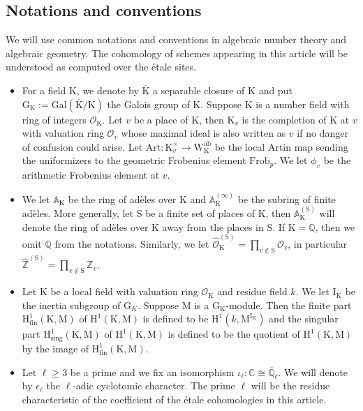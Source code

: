 \documentclass[10pt]{amsart}
\numberwithin{equation}{section}
\theoremstyle{definition}
\def\Gal{\mathrm{Gal}}
\def\Frob{\mathrm{Frob}}
\def\calO{\mathcal{O}}
\def\CC{\mathbb{C}}
\def\QQ{\mathbb{Q}}
\def\ZZ{\mathbb{Z}}
\def\rmG{\mathrm{G}}
\def\rmH{\mathrm{H}}
\def\rmI{\mathrm{I}}
\def\rmK{\mathrm{K}}
\def\rmM{\mathrm{M}}
\def\rmS{\mathrm{S}}
\begin{document}
\subsection{Notations and conventions}  We will use common notations and conventions in algebraic number theory and algebraic geometry. The cohomology  of schemes appearing in this article will be understood as computed over the \'{e}tale sites. 
\begin{itemize}
\item For a field $\rmK$, we denote by $\overline{\rmK}$ a separable closure of $\rmK$ and put $\rmG_{\rmK}:=\Gal(\overline{\rmK}/\rmK)$ the Galois group of $\rmK$.  Suppose $\rmK$ is a number field with ring of integers $\calO_{\rmK}$. Let $v$ be a place of $\rmK$, then $\rmK_{v}$ is the completion of $\rmK$ at $v$ with valuation ring $\calO_{v}$ whose maximal ideal is also written as $v$ if no danger of confusion could arise. Let $\mathrm{Art}:\rmK^{\times}_{v}\rightarrow \mathrm{W}^{\mathrm{ab}}_{\rmK}$ be the local Artin map sending the uniformizers to the geometric Frobenius element $\Frob_{p}$. We let $\phi_{v}$ be the arithmetic Frobenius element at $v$. 
\item We let $\mathbb{A}_{\rmK}$ be the ring of ad\`{e}les over $\rmK$ and $\mathbb{A}^{(\infty)}_{\rmK}$ be the subring of finite ad\`{e}les. More generally, let $\rmS$ be a finite set of places of $\rmK$, then $\mathbb{A}^{(\rmS)}_{\rmK}$ will denote the ring of ad\`{e}les over $\rmK$ away from the places in $\rmS$. If $\rmK=\QQ$, then we omit $\QQ$ from the notations. Similarly, we let $\widehat{\calO}^{(\rmS)}_{\rmK}=\prod_{v\not\in\rmS}\calO_{v}$, in particular $\widehat{\ZZ}^{(\rmS)}=\prod_{v\not\in\rmS}\ZZ_{v}$.

\item Let $\rmK$ be a local field with valuation ring $\calO_{\rmK}$ and residue field $k$. We let $\rmI_{\rmK}$ be the inertia subgroup of $\rmG_{K}$. Suppose $\rmM$ is a $\rmG_{\rmK}$-module. Then the finite part $\rmH^{1}_{\mathrm{fin}}(\rmK, \rmM)$ of $\rmH^{1}(\rmK, \rmM)$ is defined to be $\rmH^{1}(k, \rmM^{\rmI_{\rmK}})$ and the singular part $\rmH^{1}_{\mathrm{sing}}(\rmK, \rmM)$ of $\rmH^{1}(\rmK, \rmM)$ is defined to be the quotient of $\rmH^{1}(\rmK, \rmM)$ by the image of $\rmH^{1}_{\mathrm{fin}}(\rmK, \rmM)$. 

\item Let $\ell\geq 3$ be a prime and we fix an isomorphism $\iota_{\ell}: \CC\cong \overline{\QQ}_{\ell}$. We will denote by $\epsilon_{\ell}$ the $\ell$-adic cyclotomic character. The prime $\ell$ will be the residue characteristic of the coefficient of the \'etale cohomologies in this article.


\end{itemize}
\end{document}
